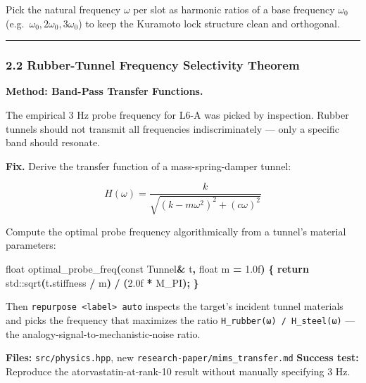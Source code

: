\documentclass[
  11pt,
  a4paper,
]{article}
\newenvironment{Shaded}{\begin{snugshade}}{\end{snugshade}}
\newcommand{\AttributeTok}[1]{\textcolor[rgb]{0.13,0.29,0.53}{#1}}
\newcommand{\BuiltInTok}[1]{#1}
\newcommand{\ControlFlowTok}[1]{\textcolor[rgb]{0.13,0.29,0.53}{\textbf{#1}}}
\newcommand{\DataTypeTok}[1]{\textcolor[rgb]{0.13,0.29,0.53}{#1}}
\newcommand{\FloatTok}[1]{\textcolor[rgb]{0.00,0.00,0.81}{#1}}
\newcommand{\NormalTok}[1]{#1}
\newcommand{\OperatorTok}[1]{\textcolor[rgb]{0.81,0.36,0.00}{\textbf{#1}}}
\begin{document}
Pick the natural frequency \(\omega\) per slot as harmonic ratios of a
base frequency \(\omega_0\) (e.g.~\(\omega_0, 2\omega_0, 3\omega_0\)) to
keep the Kuramoto lock structure clean and orthogonal.

\begin{center}\rule{0.5\linewidth}{0.5pt}\end{center}

\subsubsection{2.2 Rubber-Tunnel Frequency Selectivity
Theorem}\label{rubber-tunnel-frequency-selectivity-theorem}

\textbf{Method: Band-Pass Transfer Functions.}

The empirical 3 Hz probe frequency for L6-A was picked by inspection.
Rubber tunnels should not transmit all frequencies indiscriminately ---
only a specific band should resonate.

\textbf{Fix.} Derive the transfer function of a mass-spring-damper
tunnel:

\[
H(\omega) = \frac{k}{\sqrt{(k - m\omega^2)^2 + (c\omega)^2}}
\]

Compute the optimal probe frequency algorithmically from a tunnel's
material parameters:

\begin{Shaded}
\begin{Highlighting}[]
\DataTypeTok{float}\NormalTok{ optimal\_probe\_freq}\OperatorTok{(}\AttributeTok{const}\NormalTok{ Tunnel}\OperatorTok{\&}\NormalTok{ t}\OperatorTok{,} \DataTypeTok{float}\NormalTok{ m }\OperatorTok{=} \FloatTok{1.0}\BuiltInTok{f}\OperatorTok{)} \OperatorTok{\{}
    \ControlFlowTok{return} \BuiltInTok{std::}\NormalTok{sqrt}\OperatorTok{(}\NormalTok{t}\OperatorTok{.}\NormalTok{stiffness }\OperatorTok{/}\NormalTok{ m}\OperatorTok{)} \OperatorTok{/} \OperatorTok{(}\FloatTok{2.0}\BuiltInTok{f} \OperatorTok{*}\NormalTok{ M\_PI}\OperatorTok{);}
\OperatorTok{\}}
\end{Highlighting}
\end{Shaded}

Then \texttt{repurpose\ \textless{}label\textgreater{}\ auto} inspects
the target's incident tunnel materials and picks the frequency that
maximizes the ratio \texttt{H\_rubber(ω)\ /\ H\_steel(ω)} --- the
analogy-signal-to-mechanistic-noise ratio.

\textbf{Files:} \texttt{src/physics.hpp}, new
\texttt{research-paper/mims\_transfer.md} \textbf{Success test:}
Reproduce the atorvastatin-at-rank-10 result without manually specifying
3 Hz.
\end{document}
